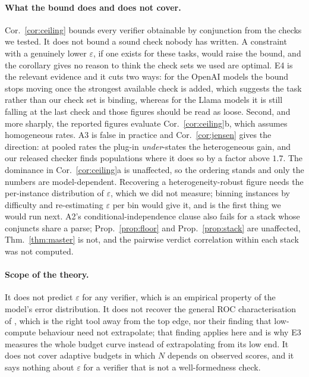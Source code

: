 \documentclass[11pt]{article}
\begin{document}
\paragraph{What the bound does and does not cover.} Cor.~\ref{cor:ceiling}
bounds every verifier obtainable by conjunction from the checks we tested. It
does not bound a sound check nobody has written. A constraint with a genuinely
lower $\varepsilon$, if one exists for these tasks, would raise the bound, and
the corollary gives no reason to think the check sets we used are optimal. E4 is
the relevant evidence and it cuts two ways: for the OpenAI models the bound
stops moving once the strongest available check is added, which suggests the
task rather than our check set is binding, whereas for the Llama models it is
still falling at the last check and those figures should be read as loose. Second, and more sharply, the reported figures evaluate
Cor.~\ref{cor:ceiling}b, which assumes homogeneous rates. A3 is false in practice
and Cor.~\ref{cor:jensen} gives the direction: at pooled rates the plug-in
\emph{under}-states the heterogeneous gain, and our released checker finds
populations where it does so by a factor above $1.7$. The dominance in
Cor.~\ref{cor:ceiling}a is unaffected, so the ordering stands and only the
numbers are model-dependent. Recovering a heterogeneity-robust figure needs the
per-instance distribution of $\varepsilon$, which we did not measure; binning
instances by difficulty and re-estimating $\varepsilon$ per bin would give it,
and is the first thing we would run next. A2's conditional-independence clause
also fails for a stack whose conjuncts share a parse; Prop.~\ref{prop:floor} and
Prop.~\ref{prop:stack} are unaffected, Thm.~\ref{thm:master} is not, and the
pairwise verdict correlation within each stack was not computed.


\paragraph{Scope of the theory.} It does not predict $\varepsilon$ for any verifier, which is an empirical property of the model's error distribution. It does not recover the general ROC characterisation of \citet{dorner2025rocnreroll}, which is the right tool away from the top edge, nor their finding that low-compute behaviour need not extrapolate; that finding applies here and is why E3 measures the whole budget curve instead of extrapolating from its low end. It does not cover adaptive budgets in which $N$ depends on observed scores, and it says nothing about $\varepsilon$ for a verifier that is not a well-formedness check.
\end{document}
